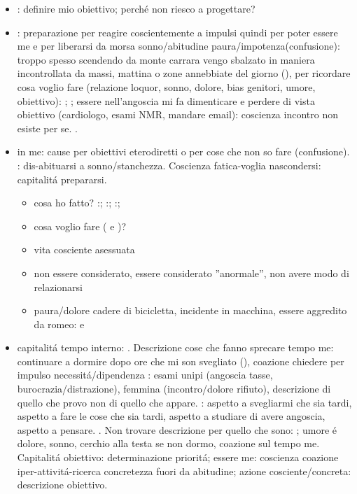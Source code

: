 \begin{itemize}
\item {}: definire mio obiettivo; perch\'e non riesco a progettare?  \item {}: preparazione per reagire coscientemente a impulsi quindi per poter essere me e per liberarsi da morsa sonno/abitudine paura/impotenza(confusione): troppo spesso scendendo da monte carrara vengo sbalzato in maniera incontrollata da massi, mattina o zone annebbiate del giorno (),  per ricordare cosa voglio fare (relazione loquor, sonno, dolore, bias genitori, umore, obiettivo): ; ; essere nell'angoscia mi fa dimenticare e perdere di vista obiettivo (cardiologo, esami NMR, mandare email): coscienza incontro non esiste per se. . 
\item {} in me: cause per obiettivi eterodiretti o per cose che non so fare (confusione). : dis-abituarsi a sonno/stanchezza. Coscienza fatica-voglia nascondersi: capitalit\'a prepararsi.
\begin{itemize}
\item cosa ho fatto? :;
:; :;
\item cosa voglio fare ( e )?
\item vita cosciente asessuata
\item non essere considerato, essere considerato ''anormale'', non avere modo di relazionarsi
\item paura/dolore cadere di bicicletta, incidente in macchina, essere aggredito da romeo:  e 
\end{itemize}
\item capitalit\'a tempo interno: . Descrizione cose che fanno sprecare tempo me: continuare a dormire dopo ore che mi son svegliato (), coazione chiedere per impulso necessit\'a/dipendenza : esami unipi (angoscia tasse, burocrazia/distrazione), femmina (incontro/dolore rifiuto), descrizione di quello che provo non di quello che appare. : aspetto a svegliarmi che sia tardi, aspetto a fare le cose che sia tardi, aspetto a studiare di avere angoscia, aspetto a pensare. . Non trovare descrizione per quello che sono: ; umore \'e dolore, sonno, cerchio alla testa se non dormo, coazione sul tempo me. Capitalit\'a obiettivo: determinazione priorit\'a; essere me: coscienza coazione iper-attivit\'a-ricerca concretezza fuori da abitudine; azione cosciente/concreta: descrizione obiettivo.

\end{itemize}
